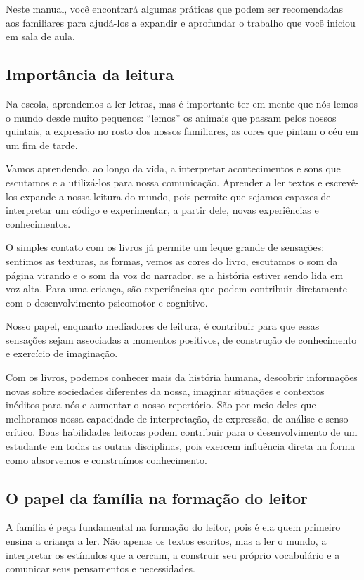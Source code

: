 \documentclass[11pt]{extarticle}
\begin{document}
Neste manual, você encontrará algumas práticas que podem ser recomendadas aos familiares para ajudá-los a expandir e aprofundar o trabalho que você iniciou em sala de aula.

\subsection{Importância da leitura}
Na escola, aprendemos a ler letras, mas é importante ter em mente que nós 
lemos o mundo desde muito pequenos: “lemos” os animais que passam pelos nossos 
quintais, a expressão no rosto dos nossos familiares, as cores que pintam o céu 
em um fim de tarde. 

Vamos aprendendo, ao longo da vida, a interpretar acontecimentos 
e sons que escutamos e a utilizá-los para nossa comunicação. Aprender a ler textos e 
escrevê-los expande a nossa leitura do mundo, pois permite que sejamos capazes de 
interpretar um código e experimentar, a partir dele, novas experiências e conhecimentos. 

O simples contato com os livros já permite um leque grande de sensações: 
sentimos as texturas, as formas, vemos as cores do livro, escutamos o som da página 
virando e o som da voz do narrador, se a história estiver sendo lida em voz alta. Para uma criança, são experiências que podem contribuir diretamente com o desenvolvimento psicomotor 
e cognitivo. 

Nosso papel, enquanto mediadores de leitura, é contribuir para que essas 
sensações sejam associadas a momentos positivos, de construção de 
conhecimento e exercício de imaginação. 

Com os livros, podemos conhecer mais da história humana, descobrir informações 
novas sobre sociedades diferentes da nossa, imaginar situações e contextos inéditos 
para nós e aumentar o nosso repertório. São por meio deles que melhoramos nossa 
capacidade de interpretação, de expressão, de análise e senso crítico. Boas habilidades 
leitoras podem contribuir para o desenvolvimento de um estudante em todas as outras 
disciplinas, pois exercem influência direta na forma como absorvemos e 
construímos conhecimento.


\subsection{O papel da família na formação do leitor}
A família é peça fundamental na formação do leitor, pois é ela quem primeiro 
ensina a criança a ler. Não apenas os textos escritos, mas a ler o mundo, a 
interpretar os estímulos que a cercam, a construir seu próprio vocabulário e a 
comunicar seus pensamentos e necessidades.
\end{document}
